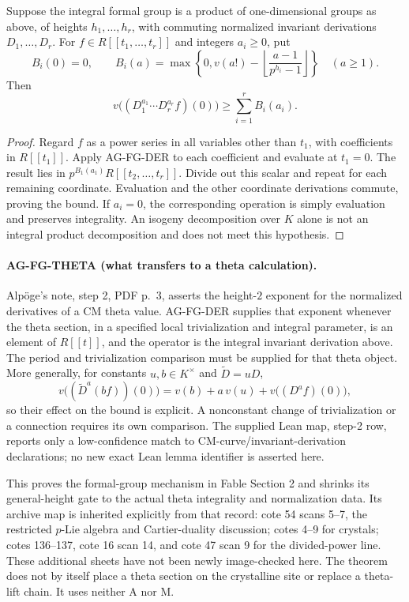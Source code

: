\begin{proposition}
Suppose the integral formal group is a product of one-dimensional
groups as above, of heights $h_1,\ldots,h_r$, with commuting
normalized invariant derivations $D_1,\ldots,D_r$. For
$f\in R[[t_1,\ldots,t_r]]$ and integers $a_i\ge0$, put
\[
 B_i(0)=0,\qquad B_i(a)=
 \max\left\{0,v(a!)-
       \left\lfloor\frac{a-1}{p^{h_i}-1}\right\rfloor\right\}
          \quad(a\ge1).
\]
Then
\[
 v\bigl((D_1^{a_1}\cdots D_r^{a_r}f)(0)\bigr)
       \ge\sum_{i=1}^r B_i(a_i).
\]
\end{proposition}
\begin{proof}
Regard $f$ as a power series in all variables other than $t_1$,
with coefficients in $R[[t_1]]$. Apply AG-FG-DER to each
coefficient and evaluate at $t_1=0$. The result lies in
$p^{B_1(a_1)}R[[t_2,\ldots,t_r]]$. Divide out this scalar and
repeat for each remaining coordinate. Evaluation and the other
coordinate derivations commute, proving the bound. If $a_i=0$,
the corresponding operation is simply evaluation and preserves
integrality. An isogeny decomposition over $K$ alone is not an
integral product decomposition and does not meet this hypothesis.
\end{proof}

\paragraph{AG-FG-THETA (what transfers to a theta calculation).}
Alpöge's note, step 2, PDF p.~3, asserts the height-$2$ exponent
for the normalized derivatives of a CM theta value. AG-FG-DER
supplies that exponent whenever the theta section, in a specified
local trivialization and integral parameter, is an element of
$R[[t]]$, and the operator is the integral invariant derivation
above. The period and trivialization comparison must be supplied
for that theta object. More generally, for constants
$u,b\in K^\times$ and $\widetilde D=uD$,
\[
 v\bigl((\widetilde D^{a}(bf))(0)\bigr)
  =v(b)+a\,v(u)+v\bigl((D^af)(0)\bigr),
\]
so their effect on the bound is explicit. A nonconstant change of
trivialization or a connection requires its own comparison.
The supplied Lean map, step-2 row, reports only a low-confidence
match to CM-curve/invariant-derivation declarations; no new exact
Lean lemma identifier is asserted here.

This proves the formal-group mechanism in Fable Section 2 and
shrinks its general-height gate to the actual theta integrality
and normalization data. Its archive map is inherited explicitly
from that record: cote 54 scans 5--7, the restricted $p$-Lie
algebra and Cartier-duality discussion; cotes 4--9 for crystals;
cotes 136--137, cote 16 scan 14, and cote 47 scan 9 for the
divided-power line. These additional sheets have not been newly
image-checked here. The theorem does not by itself place a theta
section on the crystalline site or replace a theta-lift chain.
It uses neither A nor M.

